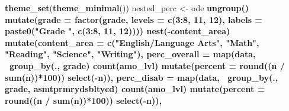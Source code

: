 \documentclass[]{article}
\newenvironment{Shaded}{\begin{snugshade}}{\end{snugshade}}
\newcommand{\DataTypeTok}[1]{\textcolor[rgb]{0.13,0.29,0.53}{#1}}
\newcommand{\DecValTok}[1]{\textcolor[rgb]{0.00,0.00,0.81}{#1}}
\newcommand{\KeywordTok}[1]{\textcolor[rgb]{0.13,0.29,0.53}{\textbf{#1}}}
\newcommand{\NormalTok}[1]{#1}
\newcommand{\OperatorTok}[1]{\textcolor[rgb]{0.81,0.36,0.00}{\textbf{#1}}}
\newcommand{\StringTok}[1]{\textcolor[rgb]{0.31,0.60,0.02}{#1}}
\begin{document}
\begin{Shaded}
\begin{Highlighting}[]
\KeywordTok{theme_set}\NormalTok{(}\KeywordTok{theme_minimal}\NormalTok{())}
\NormalTok{nested_perc <-}\StringTok{ }\NormalTok{ode }\OperatorTok{%>%}\StringTok{ }
\StringTok{  }\KeywordTok{ungroup}\NormalTok{() }\OperatorTok{%>%}\StringTok{ }
\StringTok{  }\KeywordTok{mutate}\NormalTok{(}\DataTypeTok{grade =} \KeywordTok{factor}\NormalTok{(grade, }
                        \DataTypeTok{levels =} \KeywordTok{c}\NormalTok{(}\DecValTok{3}\OperatorTok{:}\DecValTok{8}\NormalTok{, }\DecValTok{11}\NormalTok{, }\DecValTok{12}\NormalTok{),}
                        \DataTypeTok{labels =} \KeywordTok{paste0}\NormalTok{(}\StringTok{"Grade "}\NormalTok{, }\KeywordTok{c}\NormalTok{(}\DecValTok{3}\OperatorTok{:}\DecValTok{8}\NormalTok{, }\DecValTok{11}\NormalTok{, }\DecValTok{12}\NormalTok{)))) }\OperatorTok{%>%}\StringTok{ }
\StringTok{  }\KeywordTok{nest}\NormalTok{(}\OperatorTok{-}\NormalTok{content_area) }\OperatorTok{%>%}\StringTok{ }
\StringTok{  }\KeywordTok{mutate}\NormalTok{(}\DataTypeTok{content_area =} \KeywordTok{c}\NormalTok{(}\StringTok{"English/Language Arts"}\NormalTok{, }\StringTok{"Math"}\NormalTok{, }
                          \StringTok{"Reading"}\NormalTok{, }\StringTok{"Science"}\NormalTok{, }\StringTok{"Writing"}\NormalTok{),}
         \DataTypeTok{perc_overall =} \KeywordTok{map}\NormalTok{(data, }
                            \OperatorTok{~}\KeywordTok{group_by}\NormalTok{(., grade) }\OperatorTok{%>%}\StringTok{ }
\StringTok{                              }\KeywordTok{count}\NormalTok{(amo_lvl) }\OperatorTok{%>%}\StringTok{ }
\StringTok{                              }\KeywordTok{mutate}\NormalTok{(}\DataTypeTok{percent =} \KeywordTok{round}\NormalTok{((n }\OperatorTok{/}\StringTok{ }\KeywordTok{sum}\NormalTok{(n))}\OperatorTok{*}\DecValTok{100}\NormalTok{)) }\OperatorTok{%>%}\StringTok{ }
\StringTok{                              }\KeywordTok{select}\NormalTok{(}\OperatorTok{-}\NormalTok{n)),}
         \DataTypeTok{perc_disab   =} \KeywordTok{map}\NormalTok{(data, }
                            \OperatorTok{~}\KeywordTok{group_by}\NormalTok{(., grade, asmtprmrydsbltycd) }\OperatorTok{%>%}\StringTok{ }
\StringTok{                              }\KeywordTok{count}\NormalTok{(amo_lvl) }\OperatorTok{%>%}\StringTok{ }
\StringTok{                              }\KeywordTok{mutate}\NormalTok{(}\DataTypeTok{percent =} \KeywordTok{round}\NormalTok{((n }\OperatorTok{/}\StringTok{ }\KeywordTok{sum}\NormalTok{(n))}\OperatorTok{*}\DecValTok{100}\NormalTok{)) }\OperatorTok{%>%}\StringTok{ }
\StringTok{                              }\KeywordTok{select}\NormalTok{(}\OperatorTok{-}\NormalTok{n)),}
}}}}}}}}}}
\end{Highlighting}
\end{Shaded}
\end{document}

